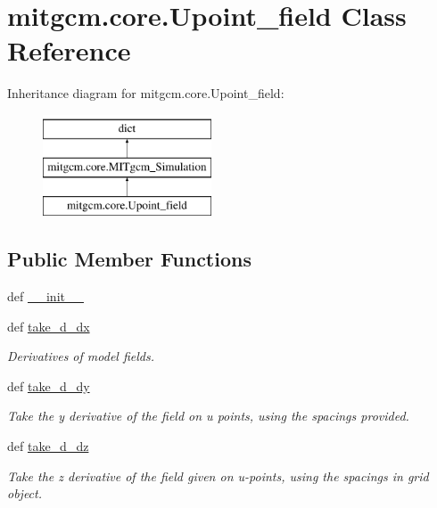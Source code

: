 \hypertarget{classmitgcm_1_1core_1_1Upoint__field}{\section{mitgcm.\+core.\+Upoint\+\_\+field Class Reference}
\label{classmitgcm_1_1core_1_1Upoint__field}
}
Inheritance diagram for mitgcm.\+core.\+Upoint\+\_\+field\+:\begin{figure}[H]
\begin{center}
\leavevmode
\includegraphics[height=3.000000cm]{classmitgcm_1_1core_1_1Upoint__field}
\end{center}
\end{figure}
\subsection*{Public Member Functions}
\begin{DoxyCompactItemize}
\item 
def \hyperlink{classmitgcm_1_1core_1_1Upoint__field_ab4adbcfd61c7b303b8499a5228cd6f77}{\+\_\+\+\_\+init\+\_\+\+\_\+}
\item 
def \hyperlink{classmitgcm_1_1core_1_1Upoint__field_a40c4ea3c2527688e8419c0a276e27d5c}{take\+\_\+d\+\_\+dx}
\begin{DoxyCompactList}\small\item\em Derivatives of model fields. \end{DoxyCompactList}\item 
def \hyperlink{classmitgcm_1_1core_1_1Upoint__field_acac1cef0245cd27c0975a84bef22a71d}{take\+\_\+d\+\_\+dy}
\begin{DoxyCompactList}\small\item\em Take the y derivative of the field on u points, using the spacings provided. \end{DoxyCompactList}\item 
def \hyperlink{classmitgcm_1_1core_1_1Upoint__field_acbc550b512401054ac04eca3dc7318af}{take\+\_\+d\+\_\+dz}
\begin{DoxyCompactList}\small\item\em Take the z derivative of the field given on u-\/points, using the spacings in grid object. \end{DoxyCompactList}\end{DoxyCompactItemize}
